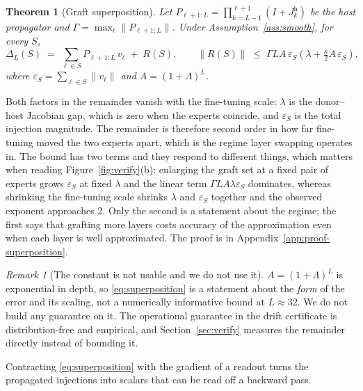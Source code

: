 \documentclass[10pt]{article}
\theoremstyle{plain}
\newtheorem{theorem}{Theorem}
\theoremstyle{definition}
\theoremstyle{remark}
\newtheorem{remark}{Remark}
\newcommand{\host}{\mathrm{h}}
\begin{document}
\begin{theorem}[Graft superposition]
\label{thm:superposition}
Let $P_{\ell+1:L} = \prod_{k=L-1}^{\ell+1}\!\left(I + J^{\host}_k\right)$ be the
host propagator and $\Gamma = \max_\ell \|P_{\ell+1:L}\|$. Under
Assumption~\ref{ass:smooth}, for every $S$,
\begin{equation}
\label{eq:superposition}
\Delta_L(S) \;=\; \sum_{\ell\in S} P_{\ell+1:L}\, v_\ell \;+\; R(S),
\qquad
\|R(S)\| \;\le\; \Gamma L A\,\varepsilon_S\!\left(\lambda + \tfrac{\kappa}{2} A\,\varepsilon_S\right),
\end{equation}
where $\varepsilon_S = \sum_{\ell\in S}\|v_\ell\|$ and $A = (1+\Lambda)^{L}$.
\end{theorem}

Both factors in the remainder vanish with the fine-tuning scale: $\lambda$ is
the donor--host Jacobian gap, which is zero when the experts coincide, and
$\varepsilon_S$ is the total injection magnitude. The remainder is therefore
second order in how far fine-tuning moved the two experts apart, which is the
regime layer swapping operates in. The bound has two terms and they respond to
different things, which matters when reading Figure~\ref{fig:verify}(b):
enlarging the graft set at a fixed pair of experts grows $\varepsilon_S$ at fixed
$\lambda$ and the linear term $\Gamma L A \lambda \varepsilon_S$ dominates, whereas
shrinking the fine-tuning scale shrinks $\lambda$ and $\varepsilon_S$ together and
the observed exponent approaches $2$. Only the second is a statement about the
regime; the first says that grafting more layers costs accuracy of the
approximation even when each layer is well approximated. The proof is in
Appendix~\ref{app:proof-superposition}.

\begin{remark}[The constant is not usable and we do not use it]
\label{rem:vacuous}
$A=(1+\Lambda)^L$ is exponential in depth, so \eqref{eq:superposition} is a
statement about the \emph{form} of the error and its scaling, not a numerically
informative bound at $L\approx 32$. We do not build any guarantee on it. The
operational guarantee in the drift certificate is distribution-free
and empirical, and Section~\ref{sec:verify} measures the remainder directly
instead of bounding it.
\end{remark}

Contracting \eqref{eq:superposition} with the gradient of a readout turns the
propagated injections into scalars that can be read off a backward pass.
\end{document}
